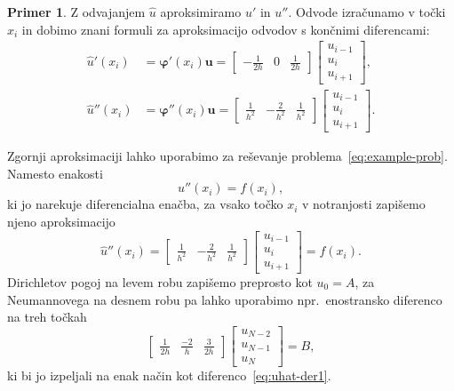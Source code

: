 \documentclass[12pt,a4paper,twoside]{article}
\theoremstyle{definition} %
\newtheorem{primer}[definicija]{Primer}
\theoremstyle{plain} %
\numberwithin{equation}{section}
\renewcommand{\b}{\boldsymbol}
\renewcommand{\phi}{\varphi}
\begin{document}
\begin{primer}
Z odvajanjem $\hat{u}$ aproksimiramo $u'$ in $u''$. Odvode izračunamo v točki $x_i$ in dobimo znani
formuli za aproksimacijo odvodov s končnimi diferencami:
\begin{align}
  \hat u'(x_i) &= \b\phi'(x_i) \b u =
  \begin{bmatrix}
    -\frac{1}{2h} & 0 & \frac{1}{2h}
  \end{bmatrix} \begin{bmatrix}
    u_{i-1} \\ u_{i} \\ u_{i+1}
  \end{bmatrix}, \label{eq:uhat-der1} \\
  \hat u''(x_i) &= \b\phi''(x_i) \b u =
  \begin{bmatrix}
    \frac{1}{h^2} & -\frac{2}{h^2} & \frac{1}{h^2}
  \end{bmatrix}\begin{bmatrix}
    u_{i-1} \\ u_{i} \\ u_{i+1}
  \end{bmatrix}.
\end{align}

Zgornji aproksimaciji lahko uporabimo za reševanje problema~\eqref{eq:example-prob}.
Namesto enakosti
\begin{equation}
  u''(x_i) = f(x_i),
\end{equation}
ki jo narekuje diferencialna enačba, za vsako točko $x_i$ v notranjosti zapišemo njeno aproksimacijo
\begin{equation}
  \hat{u}''(x_i) =
  \begin{bmatrix}
    \frac{1}{h^2} & -\frac{2}{h^2} & \frac{1}{h^2}
  \end{bmatrix}\begin{bmatrix}
    u_{i-1} \\ u_{i} \\ u_{i+1}
  \end{bmatrix} = f(x_i).
\end{equation}
Dirichletov pogoj na levem robu zapišemo preprosto kot $u_0 = A$,
za Neumannovega na desnem robu pa lahko uporabimo npr.~enostransko diferenco
na treh točkah
\begin{equation}
  \begin{bmatrix}
    \frac{1}{2h} & \frac{-2}{h} & \frac{3}{2h}
  \end{bmatrix}\begin{bmatrix}
    u_{N-2} \\ u_{N-1} \\ u_{N}
  \end{bmatrix} = B,
\end{equation}
ki bi jo izpeljali na enak način kot diferenco~\eqref{eq:uhat-der1}.


\end{primer}
\end{document}
